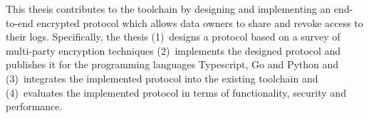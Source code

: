 \documentclass[../main.tex]{subfiles}
\begin{document}
This thesis contributes to the toolchain by designing and implementing an end-to-end encrypted protocol which allows data owners to share and revoke access to their logs.
Specifically, the thesis 
(1)~designs a protocol based on a survey of multi-party encryption techniques
(2)~implements the designed protocol and publishes it for the programming languages Typescript, Go and Python and
(3)~integrates the implemented protocol into the existing toolchain and 
(4)~evaluates the implemented protocol in terms of functionality, security and performance.
\end{document}
